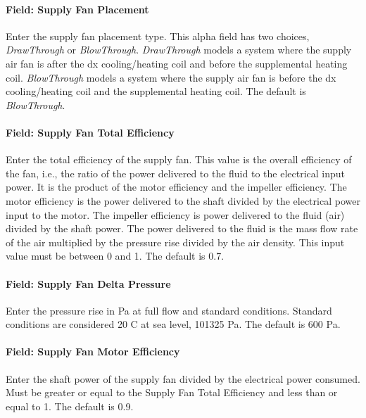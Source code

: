 \paragraph{Field: Supply Fan Placement}\label{field-supply-fan-placement-5}

Enter the supply fan placement type. This alpha field has two choices, \emph{DrawThrough} or \emph{BlowThrough}. \emph{DrawThrough} models a system where the supply air fan is after the dx cooling/heating coil and before the supplemental heating coil. \emph{BlowThrough} models a system where the supply air fan is before the dx cooling/heating coil and the supplemental heating coil. The default is \emph{BlowThrough}.

\paragraph{Field: Supply Fan Total Efficiency}\label{field-supply-fan-total-efficiency-6}

Enter the total efficiency of the supply fan. This value is the overall efficiency of the fan, i.e., the ratio of the power delivered to the fluid to the electrical input power. It is the product of the motor efficiency and the impeller efficiency. The motor efficiency is the power delivered to the shaft divided by the electrical power input to the motor. The impeller efficiency is power delivered to the fluid (air) divided by the shaft power. The power delivered to the fluid is the mass flow rate of the air multiplied by the pressure rise divided by the air density. This input value must be between 0 and 1. The default is 0.7.

\paragraph{Field: Supply Fan Delta Pressure}\label{field-supply-fan-delta-pressure-5}

Enter the pressure rise in Pa at full flow and standard conditions. Standard conditions are considered 20 C at sea level, 101325 Pa. The default is 600 Pa.

\paragraph{Field: Supply Fan Motor Efficiency}\label{field-supply-fan-motor-efficiency-6}

Enter the shaft power of the supply fan divided by the electrical power consumed. Must be greater or equal to the Supply Fan Total Efficiency and less than or equal to 1. The default is 0.9.

